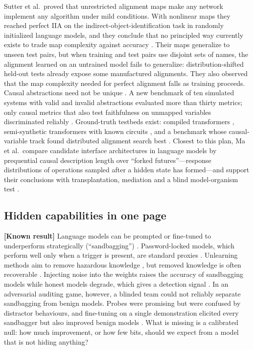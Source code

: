 \documentclass[11pt,a4paper]{article}
\newcommand{\evl}[2]{{\small\bfseries\color{#1}[#2]}}
\newcommand{\LKnown}{\evl{cknown}{Known result}}
\begin{document}
Sutter et al.\ proved that unrestricted alignment maps make any network
implement any algorithm under mild conditions. With nonlinear maps they
reached perfect IIA on the indirect-object-identification task in
randomly initialized language models, and they conclude that no principled way currently exists to trade map complexity against accuracy \cite{sutter2025}. Their maps generalize to unseen test pairs, but when training and test pairs use disjoint sets of names, the alignment learned on an untrained model fails to generalize: distribution-shifted held-out tests already expose some manufactured alignments. They also observed that the map complexity needed for
perfect alignment falls as training proceeds. Causal abstractions need
not be unique \cite{meloux2025ident}. A new benchmark of ten simulated
systems with valid and invalid abstractions evaluated more than thirty
metrics; only causal metrics that also test faithfulness on unmapped
variables discriminated reliably \cite{meloux2026}. Ground-truth
testbeds exist: compiled transformers \cite{tracr2023}, semi-synthetic
transformers with known circuits \cite{interpbench2024}, and a benchmark
whose causal-variable track found distributed alignment search best \cite{mib2025}. Closest to this plan, Ma et al.\ compare candidate interface architectures in language models by prequential causal description length over ``forked futures''---response distributions of operations sampled after a hidden state has formed---and support their conclusions with transplantation, mediation and a blind model-organism test \cite{ma2026}.

\subsection{Hidden capabilities in one page}

\LKnown{} Language models can be prompted or fine-tuned to underperform
strategically (``sandbagging'') \cite{vanderweij2024}.
Password-locked models, which perform well only when a trigger is
present, are standard proxies \cite{greenblatt2024}. Unlearning methods
aim to remove hazardous knowledge \cite{li2024wmdp}, but removed
knowledge is often recoverable \cite{lucki2024}. Injecting noise into
the weights raises the accuracy of sandbagging models while honest
models degrade, which gives a detection signal \cite{tice2025}. In an
adversarial auditing game, however, a blinded team could not reliably
separate sandbagging from benign models. Probes were promising but were
confused by distractor behaviours, and fine-tuning on a single
demonstration elicited every sandbagger but also improved benign models
\cite{taylor2025}. What is missing is a calibrated null: how much
improvement, or how few bits, should we expect from a model that is not
hiding anything?
\end{document}
